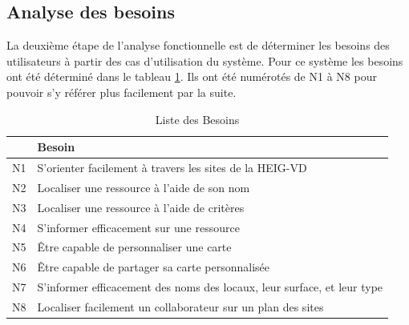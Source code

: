 \documentclass[
    iai, %
    il, %
]{heig-tb}
\begin{document}
\subsection{Analyse des besoins}
La deuxième étape de l'analyse fonctionnelle est de déterminer les besoins des utilisateurs à partir des cas d'utilisation du système.
Pour ce système les besoins ont été déterminé dans le tableau \ref{besoins}. Ils ont été numérotés de N1 à N8 pour pouvoir s'y référer plus facilement par la suite.
\begin{table}[H]
    \begin{center}
        \caption{Liste des Besoins \label{besoins}}
        \begin{tabular}{l|l}
               & Besoin                                                                  \\ \hline
            N1 & S'orienter facilement à travers les sites de la HEIG-VD                 \\
            N2 & Localiser une ressource à l'aide de son nom                             \\
            N3 & Localiser une ressource à l'aide de critères                            \\
            N4 & S'informer efficacement sur une ressource                               \\
            N5 & Être capable de personnaliser une carte                                 \\
            N6 & Être capable de partager sa carte personnalisée                         \\
            N7 & S'informer efficacement des noms des locaux, leur surface, et leur type \\
            N8 & Localiser facilement un collaborateur sur un plan des sites
        \end{tabular}
    \end{center}
\end{table}

\newpage
\end{document}
